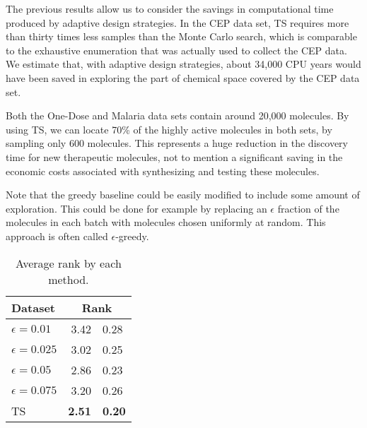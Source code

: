 The previous results allow us to consider the savings in computational time produced by adaptive design strategies. In the CEP data set, TS requires more than thirty times less samples than the Monte Carlo search, which is comparable to the exhaustive enumeration that was actually used to collect the CEP data. We estimate that, with adaptive design strategies, about 34,000 CPU years would have been saved in exploring the part of chemical space covered by the CEP data set. 

Both the One-Dose and Malaria data sets contain around 20,000 molecules. By using TS, we can locate 70\% of the highly active molecules in both sets, by sampling only 600 molecules. This represents a huge reduction in the discovery time for new therapeutic molecules, not to mention a significant saving in the economic costs associated with synthesizing and testing these molecules.

Note that the greedy baseline could be easily modified to include some amount of exploration. This could be done for example by replacing an $\epsilon$ fraction of the molecules in each batch with molecules chosen uniformly at random. This approach is often called $\epsilon$-greedy.

\begin{table}
\centering
\caption{Average rank by each method.}\label{tab:results_epsilon_greedy}
\begin{tabular}{lr@{$\pm$}l}
\hline
\bf{Dataset}& \multicolumn{2}{c}{\bf{Rank}}\\
\hline
$\epsilon = 0.01$ & 3.42 & 0.28 \\
$\epsilon = 0.025$ & 3.02 & 0.25 \\
$\epsilon = 0.05$ & 2.86 & 0.23 \\
$\epsilon = 0.075$ & 3.20 & 0.26 \\
TS & \bf{ 2.51 }&\bf{ 0.20 } \\
\hline
\end{tabular}
\end{table}
